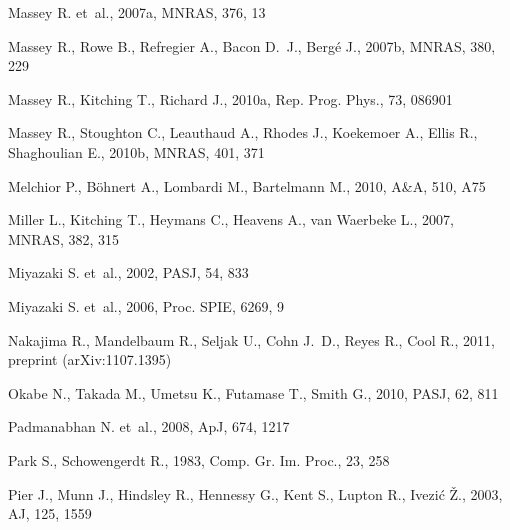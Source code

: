 \documentclass[twocolumn,useAMS,usenatbib]{mn2e}
\makeatletter
\def\reff@jnl#1{{\rm#1\/}}
\def\pasj{\reff@jnl{PASJ}}              %
\makeatother
\begin{document}
\begin{thebibliography}{}
 {Massey} R. et~al., 2007a, MNRAS, 376, 13

{Massey} R., {Rowe} B., {Refregier} A., {Bacon} D.~J., Berg{\'e} J.,
2007b, MNRAS, 380, 229

{Massey} R., {Kitching} T., {Richard} J., 2010a, Rep. Prog. Phys., 73, 086901

 {Massey} R., {Stoughton} C., {Leauthaud} A., {Rhodes} J., {Koekemoer} A., {Ellis} R., {Shaghoulian} E., 2010b, MNRAS, 401, 371


 {Melchior} P., {B{\"o}hnert} A., {Lombardi} M., {Bartelmann} M., 2010, A\&A, 510, A75

 {Miller} L., {Kitching} T., {Heymans} C., {Heavens} A., {van Waerbeke} L., 2007, MNRAS, 382, 315

 {Miyazaki} S. et~al., 2002, PASJ, 54, 833

 {Miyazaki} S. et~al., 2006, Proc. SPIE, 6269, 9

{Nakajima} R.,  {Mandelbaum} R.,  {Seljak} U.,  {Cohn} J.~D.,  
	{Reyes} R.,  {Cool} R., 2011, preprint (arXiv:1107.1395)

 {Okabe} N., {Takada} M., {Umetsu} K., {Futamase} T., {Smith} G., 2010, \pasj, 62, 811

 {Padmanabhan} N. et~al., 2008, ApJ, 674, 1217

 {Park} S., {Schowengerdt} R., 1983, Comp. Gr. Im. Proc., 23, 258

 {Pier} J., {Munn} J., {Hindsley} R., {Hennessy} G., {Kent} S., {Lupton} R., {Ivezi{\'c}} {\v Z}., 2003, AJ, 125, 1559


\end{thebibliography}
\end{document}

